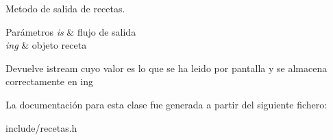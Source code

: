 Metodo de salida de recetas. 


\begin{DoxyParams}{Parámetros}
{\em is} & flujo de salida \\
\hline
{\em ing} & objeto receta \\
\hline
\end{DoxyParams}
\begin{DoxyReturn}{Devuelve}
istream cuyo valor es lo que se ha leido por pantalla y se almacena correctamente en ing 
\end{DoxyReturn}


La documentación para esta clase fue generada a partir del siguiente fichero\+:\begin{DoxyCompactItemize}
\item 
include/recetas.\+h\end{DoxyCompactItemize}
